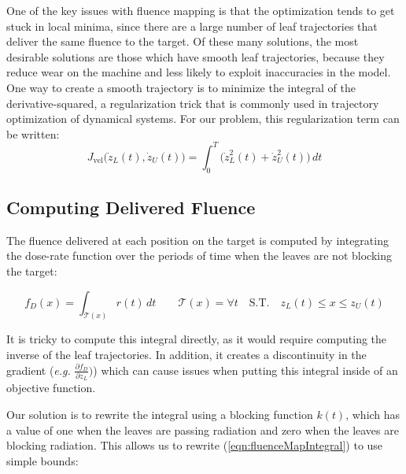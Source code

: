One of the key issues with fluence mapping is that the
optimization tends to get stuck in local minima,
since there are a large number of leaf trajectories that deliver the same fluence to the target.
Of these many solutions, the most desirable solutions are those which have smooth leaf trajectories,
because they reduce wear on the machine and less likely to exploit inaccuracies in the model.
One way to create a smooth trajectory is to minimize the integral of the derivative-squared,
a regularization trick that is commonly used in trajectory optimization of dynamical systems.
For our problem, this regularization term can be written:
\begin{equation}
  J_\text{vel}\big(\dot{z}_L(t), \dot{z}_U(t)\big)
    = \int_0^T \! \big( \dot{z}_L^2(t) + \dot{z}_U^2(t) \big) \,dt
\end{equation}

\subsection{Computing Delivered Fluence}

The fluence delivered at each position on the target is computed by integrating the
dose-rate function over the periods of time when the leaves are not blocking the target:

\begin{equation}
  f_D(x) = \int_{\mathcal{T}(x)} \! r(t) \,dt
  \quad \quad
  \mathcal{T}(x) = \forall t
  \quad
  \text{S.T.}
  \quad
  z_L(t) \leq x \leq z_U(t)
  \label{eqn:fluenceMapIntegral}
\end{equation}

It is tricky to compute this integral directly, as it would require computing
the inverse of the leaf trajectories.
In addition, it creates a discontinuity in the gradient
(\textit{e.g.} $\tfrac{\partial f_D}{\partial z_L})$)
which can cause issues when putting this integral inside of an objective function.

Our solution is to rewrite the integral using a blocking function $k(t)$,
which has a value of one when the leaves are passing radiation and
zero when the leaves are blocking radiation.
This allows us to rewrite (\ref{eqn:fluenceMapIntegral}) to use simple bounds:

